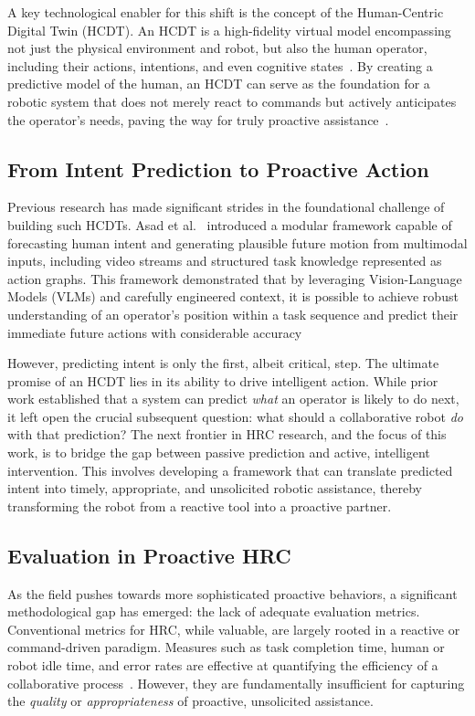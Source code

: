 \documentclass[11pt, a4paper]{article}
\begin{document}
A key technological enabler for this shift is the concept of the Human-Centric Digital Twin (HCDT). An HCDT is a high-fidelity virtual model encompassing not just the physical environment and robot, but also the human operator, including their actions, intentions, and even cognitive states~\cite{Polini2020}. By creating a predictive model of the human, an HCDT can serve as the foundation for a robotic system that does not merely react to commands but actively anticipates the operator's needs, paving the way for truly proactive assistance~\cite{Polini2020}.

\subsection{From Intent Prediction to Proactive Action}

Previous research has made significant strides in the foundational challenge of building such HCDTs. Asad et al.~\cite{Asad2024_intention} introduced a modular framework capable of forecasting human intent and generating plausible future motion from multimodal inputs, including video streams and structured task knowledge represented as action graphs. This framework demonstrated that by leveraging Vision-Language Models (VLMs) and carefully engineered context, it is possible to achieve robust understanding of an operator's position within a task sequence and predict their immediate future actions with considerable accuracy~\cite{Asad2024_intention}

However, predicting intent is only the first, albeit critical, step. The ultimate promise of an HCDT lies in its ability to drive intelligent action. While prior work established that a system can predict \textit{what} an operator is likely to do next, it left open the crucial subsequent question: what should a collaborative robot \textit{do} with that prediction? The next frontier in HRC research, and the focus of this work, is to bridge the gap between passive prediction and active, intelligent intervention. This involves developing a framework that can translate predicted intent into timely, appropriate, and unsolicited robotic assistance, thereby transforming the robot from a reactive tool into a proactive partner.

\subsection{Evaluation in Proactive HRC}

As the field pushes towards more sophisticated proactive behaviors, a significant methodological gap has emerged: the lack of adequate evaluation metrics. Conventional metrics for HRC, while valuable, are largely rooted in a reactive or command-driven paradigm. Measures such as task completion time, human or robot idle time, and error rates are effective at quantifying the efficiency of a collaborative process~\cite{Umbrico2022}. However, they are fundamentally insufficient for capturing the \textit{quality} or \textit{appropriateness} of proactive, unsolicited assistance.
\end{document}
